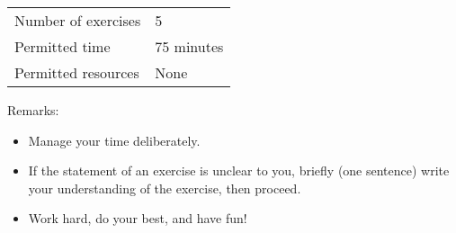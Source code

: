 \begin{center}
\begin{tabular}{l@{ : }l}
Number of exercises	&	5			\\
Permitted time		&	75 minutes	\\
Permitted resources	&	None
\end{tabular}
\end{center}
\vspace{.25in}
\noindent{}Remarks:
\begin{itemize}
\item Manage your time deliberately.
\item If the statement of an exercise is unclear to you, briefly (one sentence) write your understanding of the exercise, then proceed.
\item Work hard, do your best, and have fun!
\end{itemize}